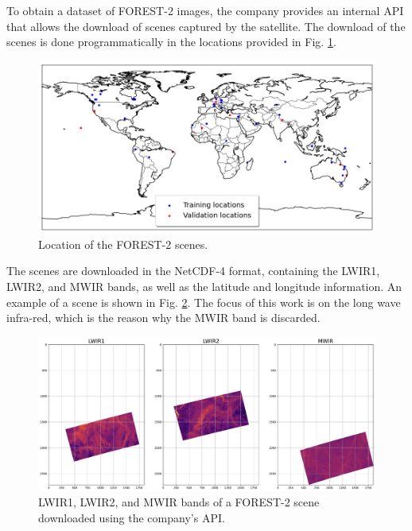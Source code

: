     To obtain a dataset of FOREST-2 images, the company provides an internal API that allows the download of scenes captured by the satellite. 
    The download of the scenes is done programmatically in the locations provided in Fig. \ref{fig:4-forest-locations}. 

    \begin{figure}[H]
        \centering
        \includegraphics[width=\linewidth]{Includes/4-forest-locations.png}
        \caption{Location of the FOREST-2 scenes.}
        \label{fig:4-forest-locations}
    \end{figure}

    The scenes are downloaded in the NetCDF-4 format, containing the LWIR1, LWIR2, and MWIR bands, as well as the latitude and longitude information. 
    An example of a scene is shown in Fig. \ref{fig:4-forest-complete example}. 
    The focus of this work is on the long wave infra-red, which is the reason why the MWIR band is discarded.

    \begin{figure}[H]
        \centering
        \includegraphics[width=\linewidth]{Includes/4-forest2-unprocessed-bands.pdf}
        \caption{LWIR1, LWIR2, and MWIR bands of a FOREST-2 scene downloaded using the company's API.}
        \label{fig:4-forest-complete example}
    \end{figure}

